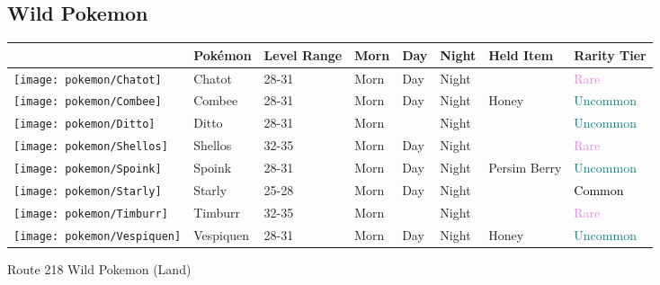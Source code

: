 \subsection{Wild Pokemon}%
\label{subsec:WildPokemon}%
\begin{longtable}{||l l l l l l l l||}%
\hline%
&Pokémon&Level Range&Morn&Day&Night&Held Item&Rarity Tier\\%
\hline%
\endhead%
\hline%
\texttt{[image: pokemon/Chatot]}&Chatot&28{-}31&Morn&Day&Night&&\textcolor{violet}{%
Rare%
}\\%
\hline%
\texttt{[image: pokemon/Combee]}&Combee&28{-}31&Morn&Day&Night&Honey&\textcolor{teal}{%
Uncommon%
}\\%
\hline%
\texttt{[image: pokemon/Ditto]}&Ditto&28{-}31&Morn&&Night&&\textcolor{teal}{%
Uncommon%
}\\%
\hline%
\texttt{[image: pokemon/Shellos]}&Shellos&32{-}35&Morn&Day&Night&&\textcolor{violet}{%
Rare%
}\\%
\hline%
\texttt{[image: pokemon/Spoink]}&Spoink&28{-}31&Morn&Day&Night&Persim Berry&\textcolor{teal}{%
Uncommon%
}\\%
\hline%
\texttt{[image: pokemon/Starly]}&Starly&25{-}28&Morn&Day&Night&&\textcolor{black}{%
Common%
}\\%
\hline%
\texttt{[image: pokemon/Timburr]}&Timburr&32{-}35&Morn&&Night&&\textcolor{violet}{%
Rare%
}\\%
\hline%
\texttt{[image: pokemon/Vespiquen]}&Vespiquen&28{-}31&Morn&Day&Night&Honey&\textcolor{teal}{%
Uncommon%
}\\%
\hline%
\end{longtable}%
\caption{Route 218 Wild Pokemon (Land)}%
